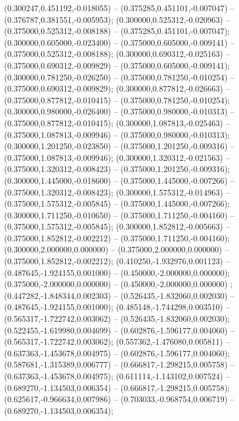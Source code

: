  (0.300247,0.451192,-0.018055) -- (0.375285,0.451101,-0.007047) -- (0.376787,0.381551,-0.005953);
 (0.300000,0.525312,-0.020963) -- (0.375000,0.525312,-0.008188) -- (0.375285,0.451101,-0.007047);
 (0.300000,0.605000,-0.023400) -- (0.375000,0.605000,-0.009141) -- (0.375000,0.525312,-0.008188);
 (0.300000,0.690312,-0.025163) -- (0.375000,0.690312,-0.009829) -- (0.375000,0.605000,-0.009141);
 (0.300000,0.781250,-0.026250) -- (0.375000,0.781250,-0.010254) -- (0.375000,0.690312,-0.009829);
 (0.300000,0.877812,-0.026663) -- (0.375000,0.877812,-0.010415) -- (0.375000,0.781250,-0.010254);
 (0.300000,0.980000,-0.026400) -- (0.375000,0.980000,-0.010313) -- (0.375000,0.877812,-0.010415);
 (0.300000,1.087813,-0.025463) -- (0.375000,1.087813,-0.009946) -- (0.375000,0.980000,-0.010313);
 (0.300000,1.201250,-0.023850) -- (0.375000,1.201250,-0.009316) -- (0.375000,1.087813,-0.009946);
 (0.300000,1.320312,-0.021563) -- (0.375000,1.320312,-0.008423) -- (0.375000,1.201250,-0.009316);
 (0.300000,1.445000,-0.018600) -- (0.375000,1.445000,-0.007266) -- (0.375000,1.320312,-0.008423);
 (0.300000,1.575312,-0.014963) -- (0.375000,1.575312,-0.005845) -- (0.375000,1.445000,-0.007266);
 (0.300000,1.711250,-0.010650) -- (0.375000,1.711250,-0.004160) -- (0.375000,1.575312,-0.005845);
 (0.300000,1.852812,-0.005663) -- (0.375000,1.852812,-0.002212) -- (0.375000,1.711250,-0.004160);
 (0.300000,2.000000,0.000000) -- (0.375000,2.000000,0.000000) -- (0.375000,1.852812,-0.002212);
 (0.410250,-1.932976,0.001123) -- (0.487645,-1.924155,0.001000) -- (0.450000,-2.000000,0.000000);
 (0.375000,-2.000000,0.000000) -- (0.450000,-2.000000,0.000000) ;
 (0.447282,-1.848344,0.002303) -- (0.526435,-1.832060,0.002030) -- (0.487645,-1.924155,0.001000);
 (0.485148,-1.744298,0.003510) -- (0.565317,-1.722742,0.003062) -- (0.526435,-1.832060,0.002030);
 (0.522455,-1.619980,0.004699) -- (0.602876,-1.596177,0.004060) -- (0.565317,-1.722742,0.003062);
 (0.557362,-1.476080,0.005811) -- (0.637363,-1.453678,0.004975) -- (0.602876,-1.596177,0.004060);
 (0.587681,-1.315389,0.006777) -- (0.666817,-1.298215,0.005758) -- (0.637363,-1.453678,0.004975);
 (0.611114,-1.143102,0.007524) -- (0.689270,-1.134503,0.006354) -- (0.666817,-1.298215,0.005758);
 (0.625617,-0.966634,0.007986) -- (0.703033,-0.968754,0.006719) -- (0.689270,-1.134503,0.006354);
